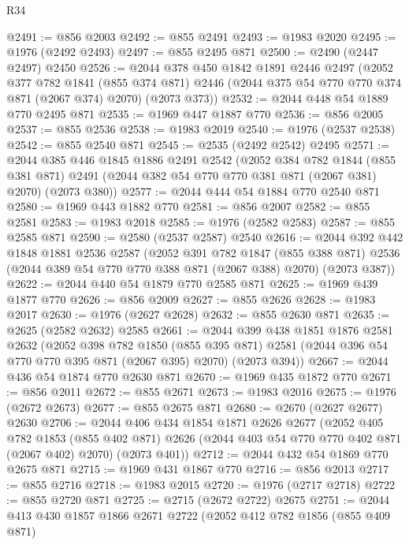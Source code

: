 \begin{lexlean}{R34}
\begin{coremodule}
@2491 := @856 @2003
@2492 := @855 @2491
@2493 := @1983 @2020
@2495 := @1976 (@2492 @2493)
@2497 := @855 @2495 @871
@2500 := @2490 (@2447 @2497) @2450
@2526 := @2044
    @378
    @450
    @1842
    @1891
    @2446
    @2497
    (@2052
      @377
      @782
      @1841
      (@855 @374 @871)
      @2446
      (@2044 @375 @54 @770 @770 @374 @871 (@2067 @374) @2070)
      (@2073 @373))
@2532 := @2044 @448 @54 @1889 @770 @2495 @871
@2535 := @1969 @447 @1887 @770
@2536 := @856 @2005
@2537 := @855 @2536
@2538 := @1983 @2019
@2540 := @1976 (@2537 @2538)
@2542 := @855 @2540 @871
@2545 := @2535 (@2492 @2542) @2495
@2571 := @2044
    @385
    @446
    @1845
    @1886
    @2491
    @2542
    (@2052
      @384
      @782
      @1844
      (@855 @381 @871)
      @2491
      (@2044 @382 @54 @770 @770 @381 @871 (@2067 @381) @2070)
      (@2073 @380))
@2577 := @2044 @444 @54 @1884 @770 @2540 @871
@2580 := @1969 @443 @1882 @770
@2581 := @856 @2007
@2582 := @855 @2581
@2583 := @1983 @2018
@2585 := @1976 (@2582 @2583)
@2587 := @855 @2585 @871
@2590 := @2580 (@2537 @2587) @2540
@2616 := @2044
    @392
    @442
    @1848
    @1881
    @2536
    @2587
    (@2052
      @391
      @782
      @1847
      (@855 @388 @871)
      @2536
      (@2044 @389 @54 @770 @770 @388 @871 (@2067 @388) @2070)
      (@2073 @387))
@2622 := @2044 @440 @54 @1879 @770 @2585 @871
@2625 := @1969 @439 @1877 @770
@2626 := @856 @2009
@2627 := @855 @2626
@2628 := @1983 @2017
@2630 := @1976 (@2627 @2628)
@2632 := @855 @2630 @871
@2635 := @2625 (@2582 @2632) @2585
@2661 := @2044
    @399
    @438
    @1851
    @1876
    @2581
    @2632
    (@2052
      @398
      @782
      @1850
      (@855 @395 @871)
      @2581
      (@2044 @396 @54 @770 @770 @395 @871 (@2067 @395) @2070)
      (@2073 @394))
@2667 := @2044 @436 @54 @1874 @770 @2630 @871
@2670 := @1969 @435 @1872 @770
@2671 := @856 @2011
@2672 := @855 @2671
@2673 := @1983 @2016
@2675 := @1976 (@2672 @2673)
@2677 := @855 @2675 @871
@2680 := @2670 (@2627 @2677) @2630
@2706 := @2044
    @406
    @434
    @1854
    @1871
    @2626
    @2677
    (@2052
      @405
      @782
      @1853
      (@855 @402 @871)
      @2626
      (@2044 @403 @54 @770 @770 @402 @871 (@2067 @402) @2070)
      (@2073 @401))
@2712 := @2044 @432 @54 @1869 @770 @2675 @871
@2715 := @1969 @431 @1867 @770
@2716 := @856 @2013
@2717 := @855 @2716
@2718 := @1983 @2015
@2720 := @1976 (@2717 @2718)
@2722 := @855 @2720 @871
@2725 := @2715 (@2672 @2722) @2675
@2751 := @2044
    @413
    @430
    @1857
    @1866
    @2671
    @2722
    (@2052
      @412
      @782
      @1856
      (@855 @409 @871)

\end{coremodule}
\end{lexlean}
